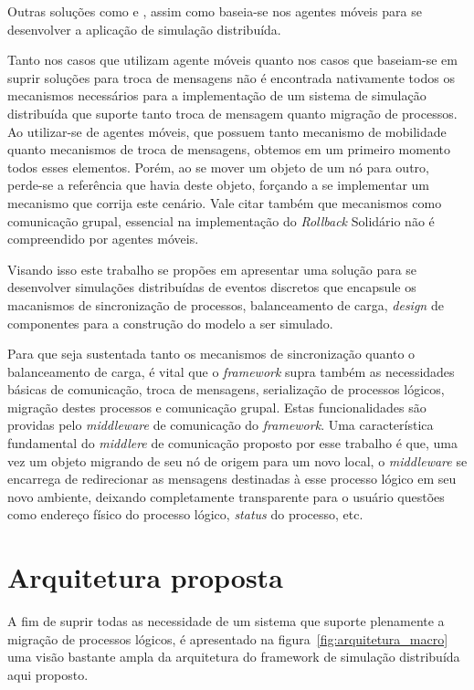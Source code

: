 Outras soluções como \cite{SASSY} e \cite{}, assim como \cite{RIBEIROALVES} baseia-se nos agentes móveis para se desenvolver a aplicação de simulação distribuída.

Tanto nos casos que utilizam agente móveis quanto nos casos que baseiam-se em suprir soluções para troca de mensagens não é encontrada nativamente todos os mecanismos necessários para a implementação de um sistema de simulação distribuída que suporte tanto troca de mensagem quanto migração de processos. Ao utilizar-se de agentes móveis, que possuem tanto mecanismo de mobilidade quanto mecanismos de troca de mensagens, obtemos em um primeiro momento todos esses elementos. Porém, ao se mover um objeto de um nó para outro, perde-se a referência que havia deste objeto, forçando a se implementar um mecanismo que corrija este cenário. Vale citar também que mecanismos como comunicação grupal, essencial na implementação do \textit{Rollback} Solidário não é compreendido por agentes móveis.

Visando isso este trabalho se propões em apresentar uma solução para se desenvolver simulações distribuídas de eventos discretos que encapsule os macanismos de sincronização de processos, balanceamento de carga, \textit{design} de componentes para a construção do modelo a ser simulado.

Para que seja sustentada tanto os mecanismos de sincronização quanto o balanceamento de carga, é vital que o \textit{framework} supra também as necessidades básicas de comunicação, troca de mensagens, serialização de processos lógicos, migração destes processos e comunicação grupal. Estas funcionalidades são providas pelo \textit{middleware} de comunicação do \textit{framework}. Uma característica fundamental do \textit{middlere} de comunicação proposto por esse trabalho é que, uma vez um objeto migrando de seu nó de origem para um novo local, o \textit{middleware} se encarrega de redirecionar as mensagens destinadas à esse processo lógico em seu novo ambiente, deixando completamente transparente para o usuário questões como endereço físico do processo lógico, \textit{status} do processo, etc.

\section{Arquitetura proposta}

A fim de suprir todas as necessidade de um sistema que suporte plenamente a migração de processos lógicos, é apresentado na figura~\ref{fig:arquitetura_macro} uma visão bastante ampla da arquitetura do framework de simulação distribuída aqui proposto.

